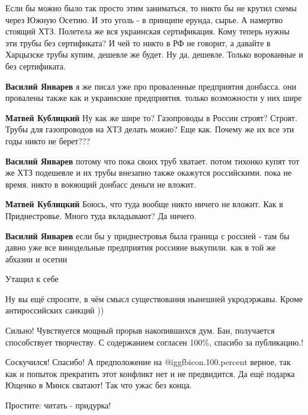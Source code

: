 \begin{itemize}
\begin{itemize}
Если бы можно было так просто этим заниматься, то никто бы не крутил схемы через Южную Осетию. И это уголь - в принципе ерунда, сырье. А намертво стоящий ХТЗ. Полетела же вся украинская сертификация. Кому теперь нужны эти трубы без сертификата? И чей то никто в РФ не говорит, а давайте в Харцызске трубы купим, дешевле же будет. Ну да, дешевле. Только ворованные и без сертификата.

\textbf{Василий Январев} я же писал уже про проваленные предприятия донбасса. они провалены также как и украинские предприятия. только возможности у них шире

\textbf{Матвей Кублицкий} Ну как же шире то? Газопроводы в России строят? Строят. Трубы для газопроводов на ХТЗ делать можно? Еще как. Почему же их все эти годы никто не берет???

\textbf{Василий Январев} потому что пока своих труб хватает. потом тихонко купят тот же ХТЗ подешевле и их трубы внезапно также окажутся российскими. пока не время. никто в воюющий донбасс деньги не вложит.

\textbf{Матвей Кублицкий} Боюсь, что туда вообще никто ничего не вложит. Как в Приднестровье. Много туда вкладывают? Да ничего.

\textbf{Василий Январев} если бы у приднестровья была граница с россией - там бы давно уже все винодельные предприятия россияне выкупили. как в той же абхазии и осетии

\end{itemize} %

Утащил к себе

Ну вы ещё спросите, в чём смысл существования нынешней укродэржавы. Кроме антироссийских санкций ))


Сильно! Чувствуется мощный прорыв накопившихся дум. Бан, получается способствует
творчеству. С содержанием согласен 100\%, спасибо за публикацию.!


Соскучился! Спасибо! А предположение на  @igg{fbicon.100.percent}  верное, так как и попыток прекратить
этот конфликт нет и не предвидится. Да ещё подарка Ющенко в Минск сватают! Так
что ужас без конца.

Простите: читать - придурка!


\end{itemize}
